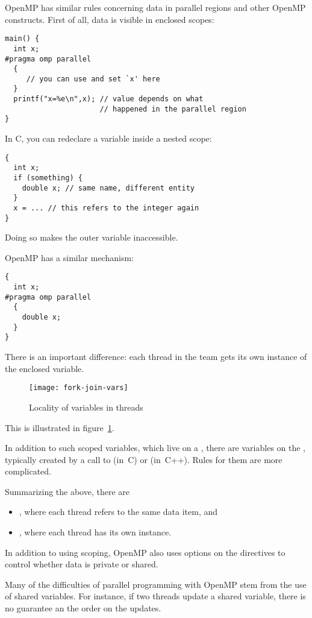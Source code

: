 OpenMP has similar rules concerning data in parallel regions
and other OpenMP constructs. First of all, data is visible
in enclosed scopes:
\begin{lstlisting}
main() {
  int x;
#pragma omp parallel
  {
     // you can use and set `x' here
  }
  printf("x=%e\n",x); // value depends on what
                      // happened in the parallel region
}
\end{lstlisting}

In C, you can redeclare a variable inside a nested scope:
\begin{lstlisting}
{
  int x;
  if (something) {
    double x; // same name, different entity
  }
  x = ... // this refers to the integer again
}
\end{lstlisting}
Doing so makes the outer variable inaccessible.

OpenMP has a similar mechanism:
\begin{lstlisting}
{
  int x;
#pragma omp parallel
  {
    double x;
  }
}
\end{lstlisting}
There is an important difference: each thread in the team
gets its own instance of the enclosed variable.

\begin{figure}[ht]
\texttt{[image: fork-join-vars]}
\caption{Locality of variables in threads}
\label{fig:threadvars}
\end{figure}
%
This is illustrated in figure~\ref{fig:threadvars}.

In addition to such scoped variables, which live on a ,
there are variables on the
, typically created by a call to 
(in~C) or  (in~C++). Rules for them are more complicated.

Summarizing the above, there are
\begin{itemize}
\item {},
  where each thread refers to the same data item, and
\item {},
  where each thread has its own instance.
\end{itemize}
In addition to using scoping, OpenMP also uses options on the directives
to control whether data is private or shared.

Many of the difficulties of parallel programming with OpenMP stem
from the use of shared variables. For instance, if two threads
update a shared variable, there is no guarantee an the order on the updates.

